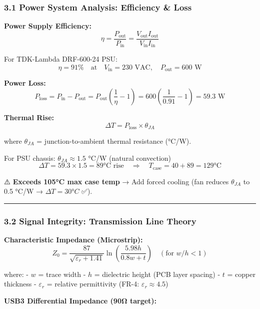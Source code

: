 \documentclass[
]{article}
\begin{document}
\hypertarget{power-system-analysis-efficiency-loss}{%
\subsubsection{3.1 Power System Analysis: Efficiency \&
Loss}\label{power-system-analysis-efficiency-loss}}

\textbf{Power Supply Efficiency:} \[
\eta = \frac{P_{\text{out}}}{P_{\text{in}}} = \frac{V_{\text{out}} I_{\text{out}}}{V_{\text{in}} I_{\text{in}}}
\]

For TDK-Lambda DRF-600-24 PSU: \[
\eta = 91\% \quad \text{at} \quad V_{\text{in}} = 230 \text{ VAC}, \quad P_{\text{out}} = 600 \text{ W}
\]

\textbf{Power Loss:} \[
P_{\text{loss}} = P_{\text{in}} - P_{\text{out}} = P_{\text{out}} \left( \frac{1}{\eta} - 1 \right) = 600 \left( \frac{1}{0.91} - 1 \right) = 59.3 \text{ W}
\]

\textbf{Thermal Rise:} \[
\Delta T = P_{\text{loss}} \times \theta_{JA}
\]

where \(\theta_{JA}\) = junction-to-ambient thermal resistance (°C/W).

For PSU chassis: \(\theta_{JA} \approx 1.5\) °C/W (natural convection)
\[
\Delta T = 59.3 \times 1.5 = 89 \text{°C rise} \quad \Rightarrow \quad T_{\text{case}} = 40 + 89 = 129 \text{°C}
\]

⚠️ \textbf{Exceeds 105°C max case temp} → Add forced cooling (fan
reduces \(\theta_{JA}\) to 0.5 °C/W → \(\Delta T = 30°C\) ✅).

\begin{center}\rule{0.5\linewidth}{0.5pt}\end{center}

\hypertarget{signal-integrity-transmission-line-theory}{%
\subsubsection{3.2 Signal Integrity: Transmission Line
Theory}\label{signal-integrity-transmission-line-theory}}

\textbf{Characteristic Impedance (Microstrip):} \[
Z_0 = \frac{87}{\sqrt{\varepsilon_r + 1.41}} \ln\left( \frac{5.98 h}{0.8 w + t} \right) \quad (\text{for } w/h < 1)
\]

where: - \(w\) = trace width - \(h\) = dielectric height (PCB layer
spacing) - \(t\) = copper thickness - \(\varepsilon_r\) = relative
permittivity (FR-4: \(\varepsilon_r \approx 4.5\))

\textbf{USB3 Differential Impedance (90Ω target):}
\end{document}
